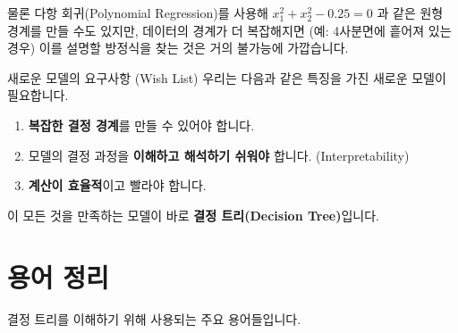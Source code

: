 \documentclass[11pt,a4paper]{book}
\theoremstyle{definition}
\begin{document}
물론 다항 회귀(Polynomial Regression)를 사용해 $x_1^2 + x_2^2 - 0.25 = 0$ 과 같은 원형 경계를 만들 수도 있지만, 데이터의 경계가 더 복잡해지면 (예: 4사분면에 흩어져 있는 경우) 이를 설명할 방정식을 찾는 것은 거의 불가능에 가깝습니다.

\begin{tcolorbox}{새로운 모델의 요구사항 (Wish List)}
    우리는 다음과 같은 특징을 가진 새로운 모델이 필요합니다.
    \begin{enumerate}
        \item \textbf{복잡한 결정 경계}를 만들 수 있어야 합니다.
        \item 모델의 결정 과정을 \textbf{이해하고 해석하기 쉬워야} 합니다. (Interpretability)
        \item \textbf{계산이 효율적}이고 빨라야 합니다.
    \end{enumerate}
    이 모든 것을 만족하는 모델이 바로 \textbf{결정 트리(Decision Tree)}입니다.
\end{tcolorbox}


\section{용어 정리}
결정 트리를 이해하기 위해 사용되는 주요 용어들입니다.
\end{document}
